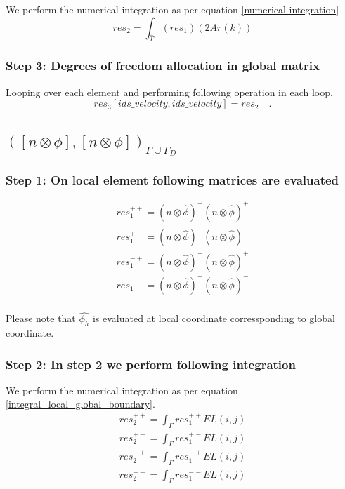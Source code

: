 \documentclass[a4paper]{book}
\begin{document}
We perform the numerical integration as per equation \ref{numerical integration} 
\begin{equation}
res_2 = \int_{\hat{T}} (res_1) (2 Ar(k))
\end{equation}

\subsubsection{Step 3: Degrees of freedom allocation in global matrix}
 
Looping over each element and performing following operation in each loop,
\begin{equation}
res_3[ids\_velocity,ids\_velocity]=res_2 \quad \textrm{.}
\end{equation}


\subsection{$([n \otimes \phi], [n \otimes \phi])_{\Gamma \cup \Gamma_D}$}

\subsubsection{Step 1: On local element following matrices are evaluated} 

\begin{equation}
\begin{split}
res_1^{++} = (n \otimes \hat{\phi})^+ (n \otimes \hat{\phi})^+\\
res_1^{+-} = (n \otimes \hat{\phi})^+ (n \otimes \hat{\phi})^-\\
res_1^{-+} = (n \otimes \hat{\phi})^- (n \otimes \hat{\phi})^+\\
res_1^{--} = (n \otimes \hat{\phi})^- (n \otimes \hat{\phi})^-\\
\end{split}
\end{equation}

Please note that $\hat{\phi_h}$ is evaluated at local coordinate corressponding to global coordinate.

\subsubsection{Step 2: In step 2 we perform following integration}
 
We perform the numerical integration as per equation \ref{integral_local_global_boundary}.
\begin{equation}
\begin{split}
res_2^{++} = \int_{\Gamma} res_1^{++} EL(i,j)\\
res_2^{+-} = \int_{\Gamma} res_1^{+-} EL(i,j)\\
res_2^{-+} = \int_{\Gamma} res_1^{-+} EL(i,j)\\
res_2^{--} = \int_{\Gamma} res_1^{--} EL(i,j)\\
\end{split}
\end{equation}
\end{document}
